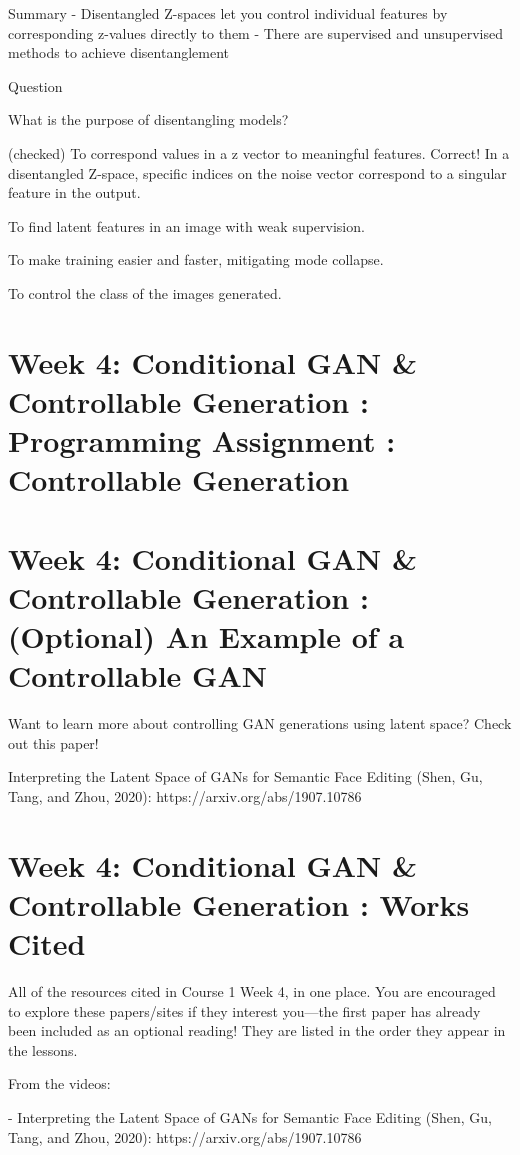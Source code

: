 \documentclass[11pt, onecolumn]{article}
\begin{document}
Summary 
- Disentangled Z-spaces let you control individual features by corresponding z-values directly to them
- There are supervised and unsupervised methods to achieve disentanglement

Question

What is the purpose of disentangling models?

(checked) To correspond values in a z vector to meaningful features.
Correct! In a disentangled Z-space, specific indices on the noise vector correspond to a singular feature in the output.

To find latent features in an image with weak supervision.

To make training easier and faster, mitigating mode collapse.

To control the class of the images generated.

\section{Week 4: Conditional GAN \& Controllable Generation : Programming Assignment : Controllable Generation}


\section{Week 4: Conditional GAN \& Controllable Generation : (Optional) An Example of a Controllable GAN}

Want to learn more about controlling GAN generations using latent space? Check out this paper!

Interpreting the Latent Space of GANs for Semantic Face Editing (Shen, Gu, Tang, and Zhou, 2020): https://arxiv.org/abs/1907.10786

\section{Week 4: Conditional GAN \& Controllable Generation : Works Cited}

All of the resources cited in Course 1 Week 4, in one place. You are encouraged to explore these papers/sites if they interest you—the first paper has already been included as an optional reading! They are listed in the order they appear in the lessons.

From the videos:

- Interpreting the Latent Space of GANs for Semantic Face Editing (Shen, Gu, Tang, and Zhou, 2020): https://arxiv.org/abs/1907.10786
\end{document}
